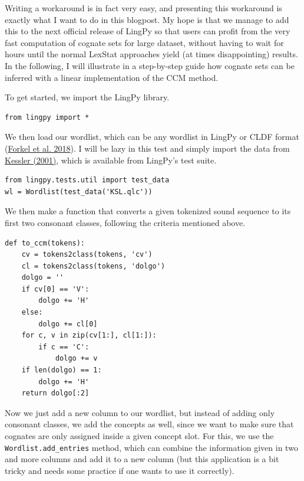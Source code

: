 \documentclass[
  a4paper,
  14pt,
  oneside,
  tablecaptionabove
]{scrbook}
\begin{document}
Writing a workaround is in fact very easy, and presenting this
workaround is exactly what I want to do in this blogpost. My hope is
that we manage to add this to the next official release of LingPy so
that users can profit from the very fast computation of cognate sets for
large dataset, without having to wait for hours until the normal LexStat
approaches yield (at times disappointing) results. In the following, I
will illustrate in a step-by-step guide how cognate sets can be inferred
with a linear implementation of the CCM method.

To get started, we import the LingPy library.

\begin{lstlisting}
from lingpy import *
\end{lstlisting}

We then load our wordlist, which can be any wordlist in LingPy or CLDF
format (\href{http://bibliography.lingpy.org?key=Forkel2018a}{Forkel et
al. 2018}). I will be lazy in this test and simply import the data from
\href{http://bibliography.lingpy.org?key=Kessler2001}{Kessler (2001)},
which is available from LingPy's test suite.

\begin{lstlisting}
from lingpy.tests.util import test_data
wl = Wordlist(test_data('KSL.qlc'))
\end{lstlisting}

We then make a function that converts a given tokenized sound sequence
to its first two consonant classes, following the criteria mentioned
above.

\begin{lstlisting}
def to_ccm(tokens):
    cv = tokens2class(tokens, 'cv')
    cl = tokens2class(tokens, 'dolgo')
    dolgo = ''
    if cv[0] == 'V': 
        dolgo += 'H'
    else:
        dolgo += cl[0]
    for c, v in zip(cv[1:], cl[1:]):
        if c == 'C':
            dolgo += v
    if len(dolgo) == 1:
        dolgo += 'H'
    return dolgo[:2]
\end{lstlisting}

Now we just add a new column to our wordlist, but instead of adding only
consonant classes, we add the concepts as well, since we want to make
sure that cognates are only assigned inside a given concept slot. For
this, we use the \lstinline!Wordlist.add_entries! method, which can
combine the information given in two and more columns and add it to a
new column (but this application is a bit tricky and needs some practice
if one wants to use it correctly).
\end{document}
